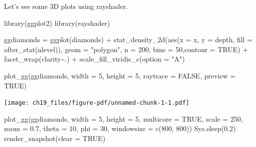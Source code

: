 \documentclass[
  letterpaper,
  DIV=11,
  numbers=noendperiod]{scrreprt}
\newenvironment{Shaded}{\begin{snugshade}}{\end{snugshade}}
\newcommand{\AttributeTok}[1]{\textcolor[rgb]{0.40,0.45,0.13}{#1}}
\newcommand{\ConstantTok}[1]{\textcolor[rgb]{0.56,0.35,0.01}{#1}}
\newcommand{\DecValTok}[1]{\textcolor[rgb]{0.68,0.00,0.00}{#1}}
\newcommand{\FloatTok}[1]{\textcolor[rgb]{0.68,0.00,0.00}{#1}}
\newcommand{\FunctionTok}[1]{\textcolor[rgb]{0.28,0.35,0.67}{#1}}
\newcommand{\NormalTok}[1]{\textcolor[rgb]{0.00,0.23,0.31}{#1}}
\newcommand{\OtherTok}[1]{\textcolor[rgb]{0.00,0.23,0.31}{#1}}
\newcommand{\SpecialCharTok}[1]{\textcolor[rgb]{0.37,0.37,0.37}{#1}}
\newcommand{\StringTok}[1]{\textcolor[rgb]{0.13,0.47,0.30}{#1}}
\begin{document}
Let's see some 3D plots using rayshader.

\begin{Shaded}
\begin{Highlighting}[]
\FunctionTok{library}\NormalTok{(ggplot2)}
\FunctionTok{library}\NormalTok{(rayshader)}

\NormalTok{ggdiamonds }\OtherTok{=} \FunctionTok{ggplot}\NormalTok{(diamonds) }\SpecialCharTok{+}
  \FunctionTok{stat\_density\_2d}\NormalTok{(}\FunctionTok{aes}\NormalTok{(}\AttributeTok{x =}\NormalTok{ x, }\AttributeTok{y =}\NormalTok{ depth, }\AttributeTok{fill =} \FunctionTok{after\_stat}\NormalTok{(nlevel)), }
                  \AttributeTok{geom =} \StringTok{"polygon"}\NormalTok{, }\AttributeTok{n =} \DecValTok{200}\NormalTok{, }\AttributeTok{bins =} \DecValTok{50}\NormalTok{,}\AttributeTok{contour =} \ConstantTok{TRUE}\NormalTok{) }\SpecialCharTok{+}
  \FunctionTok{facet\_wrap}\NormalTok{(clarity}\SpecialCharTok{\textasciitilde{}}\NormalTok{.) }\SpecialCharTok{+}
  \FunctionTok{scale\_fill\_viridis\_c}\NormalTok{(}\AttributeTok{option =} \StringTok{"A"}\NormalTok{)}

\FunctionTok{plot\_gg}\NormalTok{(ggdiamonds, }\AttributeTok{width =} \DecValTok{5}\NormalTok{, }\AttributeTok{height =} \DecValTok{5}\NormalTok{, }\AttributeTok{raytrace =} \ConstantTok{FALSE}\NormalTok{, }\AttributeTok{preview =} \ConstantTok{TRUE}\NormalTok{)}
\end{Highlighting}
\end{Shaded}

\texttt{[image: ch19\_files/figure-pdf/unnamed-chunk-1-1.pdf]}

\begin{Shaded}
\begin{Highlighting}[]
\FunctionTok{plot\_gg}\NormalTok{(ggdiamonds, }\AttributeTok{width =} \DecValTok{5}\NormalTok{, }\AttributeTok{height =} \DecValTok{5}\NormalTok{, }\AttributeTok{multicore =} \ConstantTok{TRUE}\NormalTok{, }\AttributeTok{scale =} \DecValTok{250}\NormalTok{, }
        \AttributeTok{zoom =} \FloatTok{0.7}\NormalTok{, }\AttributeTok{theta =} \DecValTok{10}\NormalTok{, }\AttributeTok{phi =} \DecValTok{30}\NormalTok{, }\AttributeTok{windowsize =} \FunctionTok{c}\NormalTok{(}\DecValTok{800}\NormalTok{, }\DecValTok{800}\NormalTok{))}
\FunctionTok{Sys.sleep}\NormalTok{(}\FloatTok{0.2}\NormalTok{)}
\FunctionTok{render\_snapshot}\NormalTok{(}\AttributeTok{clear =} \ConstantTok{TRUE}\NormalTok{)}
\end{Highlighting}
\end{Shaded}
\end{document}
